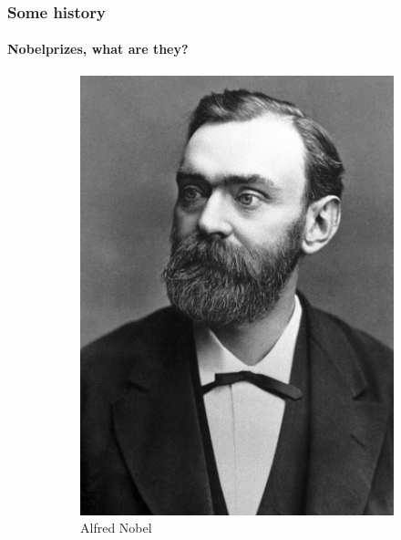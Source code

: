 \documentclass[nonav,sleutel]{beamer}
\begin{document}
\begin{frame}
\frametitle{Some history}
\framesubtitle{Nobelprizes, what are they?}
\begin{center}


\begin{figure}[H]    
    \begin{subfigure}[b]{0.33\textwidth}
        \includegraphics[width=\textwidth]{alfred.jpg}
        \caption{Alfred Nobel}
    \end{subfigure}
    \hspace{2cm}
    \begin{subfigure}[b]{0.33\textwidth}

\end{subfigure}
\end{figure}
\end{center}
\end{frame}
\end{document}
